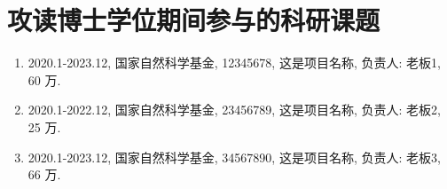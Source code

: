 

\section*{攻读博士学位期间参与的科研课题}

\begin{enumerate}[label=\arabic*., labelindent=0em, leftmargin=*]
    \item 2020.1-2023.12, 国家自然科学基金, 12345678, 这是项目名称, 负责人: 老板1, 60 万.
    \item 2020.1-2022.12, 国家自然科学基金, 23456789, 这是项目名称, 负责人: 老板2, 25 万.
    \item 2020.1-2023.12, 国家自然科学基金, 34567890, 这是项目名称, 负责人: 老板3, 66 万.
\end{enumerate}
